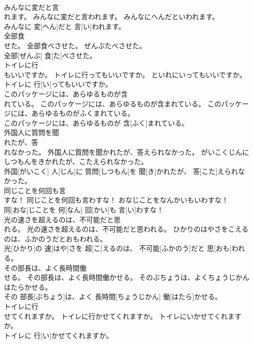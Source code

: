 \documentclass[8pt]{extreport}
\begin{document}
\begin{CJK}{UTF8}{min}
\\	みんなに変だと言
\\	れます。	みんなに変だと言われます。	みんなにへんだといわれます。	
\\	みんなに 変[へん]だと 言[い]われます。		
\\	全部食
\\	せた。	全部食べさせた。	ぜんぶたべさせた。	
\\	全部[ぜんぶ] 食[た]べさせた。		
\\	トイレに行
\\	もいいですか。	トイレに行ってもいいですか。	といれにいってもいいですか。	
\\	トイレに 行[い]ってもいいですか。		
\\	このパッケージには、あらゆるものが含
\\	れている。	このパッケージには、あらゆるものが含まれている。	このパッケージには、あらゆるものがふくまれている。	
\\	このパッケージには、あらゆるものが 含[ふく]まれている。		
\\	外国人に質問を聞
\\	れたが、答
\\	れなかった。	外国人に質問を聞かれたが、答えられなかった。	がいこくじんにしつもんをきかれたが、こたえられなかった。	
\\	外国[がいこく] 人[じん]に 質問[しつもん]を 聞[き]かれたが、 答[こた]えられなかった。		
\\	同じことを何回も言
\\	すな！	同じことを何回も言わすな！	おなじことをなんかいもいわすな！	
\\	同[おな]じことを 何[なん] 回[かい]も 言[い]わすな！		
\\	光の速さを超えるのは、不可能だと思
\\	れる。	光の速さを超えるのは、不可能だと思われる。	ひかりのはやさをこえるのは、ふかのうだとおもわれる。	
\\	光[ひかり]の 速[はや]さを 超[こ]えるのは、 不可能[ふかのう]だと 思[おも]われる。		
\\	その部長は、よく長時間働
\\	せる。	その部長は、よく長時間働かせる。	そのぶちょうは、よくちょうじかんはたらかせる。	
\\	その 部長[ぶちょう]は、よく 長時間[ちょうじかん] 働[はたら]かせる。		
\\	トイレに行
\\	せてくれますか。	トイレに行かせてくれますか。	トイレにいかせてくれますか。	
\\	トイレに 行[い]かせてくれますか。		

\end{CJK}
\end{document}

